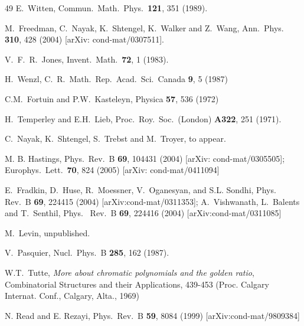 \documentclass[11pt]{article}
\begin{document}
\begin{thebibliography}{49}
  E.~Witten,
Commun.\ Math.\ Phys.\  {\bf 121}, 351 (1989).

M.~Freedman, C.~Nayak, K.~Shtengel, K.~Walker and Z.~Wang,
Ann.~Phys. {\bf 310}, {428} (2004) [arXiv: cond-mat/0307511].



  V.~F.~R.~Jones,
  Invent.\ Math.\  {\bf 72}, 1 (1983).


 H.~Wenzl,
C.~R.~Math.~Rep.~Acad.~Sci.~Canada  {\bf 9}, 5  (1987) 



C.M.~Fortuin and P.W.~Kasteleyn,
Physica {\bf 57}, 536 (1972)

H.~Temperley and E.H.~Lieb, 
Proc.~Roy.~Soc.~(London) {\bf A322}, 251 (1971).


 C.~Nayak, K.~Shtengel, S.~Trebst and M.~Troyer, to
  appear.

M. B. Hastings, Phys.~Rev.~B {\bf 69}, 104431 (2004) [arXiv:
  cond-mat/0305505];
Europhys.\ Lett.\ {\bf 70}, 824 (2005) [arXiv: cond-mat/0411094]



E.~Fradkin, D.~Huse, R.~Moessner, V.~Oganesyan, and S.L. Sondhi,
Phys.~ Rev.~B {\bf 69}, 224415  (2004)
[arXiv:cond-mat/0311353]; 
A.~Vishwanath, L.~Balents and T.~Senthil,
Phys.~ Rev.~B  {\bf 69}, 224416 (2004)
[arXiv:cond-mat/0311085]

 M.~Levin, unpublished.



V.~Pasquier,
Nucl.~Phys.~B {\bf 285}, 162 (1987).


 W.T.~Tutte, {\em More about chromatic polynomials and
the golden ratio}, Combinatorial Structures and their Applications,
439-453 (Proc. Calgary Internat. Conf., Calgary, Alta., 1969)

N. Read and E. Rezayi, Phys.~Rev.~B {\bf 59}, 8084 (1999)
[arXiv:cond-mat/9809384]


\end{thebibliography}
\end{document}
